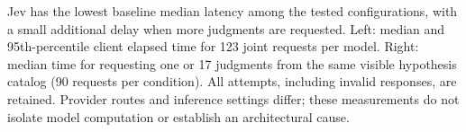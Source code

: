Jev has the lowest baseline median latency among the tested configurations, with a small additional delay when more judgments are requested. Left: median and 95th-percentile client elapsed time for 123 joint requests per model. Right: median time for requesting one or 17 judgments from the same visible hypothesis catalog (90 requests per condition). All attempts, including invalid responses, are retained. Provider routes and inference settings differ; these measurements do not isolate model computation or establish an architectural cause.
